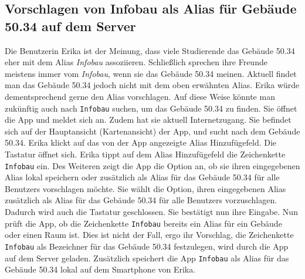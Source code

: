 \subsection{Vorschlagen von Infobau als Alias für Gebäude 50.34 auf dem Server}

Die \Gls{Benutzer}in Erika ist der Meinung, dass viele Studierende das Gebäude 50.34 eher mit dem \Gls{Alias} \textit{Infobau} assoziieren.
Schließlich sprechen ihre Freunde meistens immer vom \textit{Infobau}, wenn sie das Gebäude 50.34 meinen.
Aktuell findet man das Gebäude 50.34 jedoch nicht mit dem oben erwähnten \Gls{Alias}.
Erika würde dementsprechend gerne den \Gls{Alias} vorschlagen.
Auf diese Weise könnte man zukünftig auch nach \texttt{Infobau} suchen, um das Gebäude 50.34 zu finden.
Sie öffnet die App und meldet sich an.
Zudem hat sie aktuell Internetzugang.
Sie befindet sich auf der Hauptansicht (\Gls{Kartenansicht}) der App, und sucht nach dem Gebäude 50.34.
Erika klickt auf das von der App angezeigte \Gls{Alias} Hinzufügefeld. 
Die Tastatur öffnet sich.
Erika tippt auf dem \Gls{Alias} Hinzufügefeld die \Gls{Zeichenkette} \texttt{Infobau} ein.
Des Weiteren zeigt die App die Option an, ob sie ihren eingegebenen \Gls{Alias} \gls{lokal} speichern oder zusätzlich als \Gls{Alias} für das Gebäude 50.34 für alle \Glspl{Benutzer} vorschlagen möchte.
Sie wählt die Option, ihren eingegebenen \Gls{Alias} zusätzlich als \Gls{Alias} für das Gebäude 50.34 für alle \Glspl{Benutzer} vorzuschlagen. 
Dadurch wird auch die Tastatur geschlossen. 
Sie bestätigt nun ihre Eingabe. 
Nun prüft die App, ob die \Gls{Zeichenkette} \texttt{Infobau} bereits ein \Gls{Alias} für ein Gebäude oder einen Raum ist. 
Dies ist nicht der Fall, ergo ihr Vorschlag, die \Gls{Zeichenkette} \texttt{Infobau} als Bezeichner für das Gebäude 50.34 festzulegen, wird durch die App auf dem \Gls{Server} geladen. 
Zusätzlich speichert die App \texttt{Infobau} als \Gls{Alias} für das Gebäude 50.34 \gls{lokal} auf dem Smartphone von Erika.
